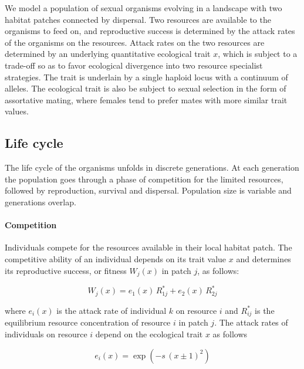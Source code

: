 We model a population of sexual organisms evolving in a landscape with two habitat patches connected by dispersal. Two resources are available to the organisms to feed on, and reproductive success is determined by the attack rates of the organisms on the resources. Attack rates on the two resources are determined by an underlying quantitative ecological trait $x$, which is subject to a trade-off so as to favor ecological divergence into two resource specialist strategies. The trait is underlain by a single haploid locus with a continuum of alleles. The ecological trait is also be subject to sexual selection in the form of assortative mating, where females tend to prefer mates with more similar trait values.

\subsection*{Life cycle}

The life cycle of the organisms unfolds in discrete generations. At each generation the population goes through a phase of competition for the limited resources, followed by reproduction, survival and dispersal. Population size is variable and generations overlap.

\paragraph{Competition} Individuals compete for the resources available in their local habitat patch. The competitive ability of an individual depends on its trait value $x$ and determines its reproductive success, or fitness $W_j(x)$ in patch $j$, as follows:

\begin{equation}
    W_j(x) = e_1(x) \, R^*_{1j} + e_2(x) \, R^*_{2j}
\end{equation}

where $e_i(x)$ is the attack rate of individual $k$ on resource $i$ and $R^*_{ij}$ is the equilibrium resource concentration of resource $i$ in patch $j$. The attack rates of individuals on resource $i$ depend on the ecological trait $x$ as follows

\begin{equation}
    e_i(x) = \exp{(-s \, (x \pm 1)^2)}
    \label{eq:attack_rates}
\end{equation}

